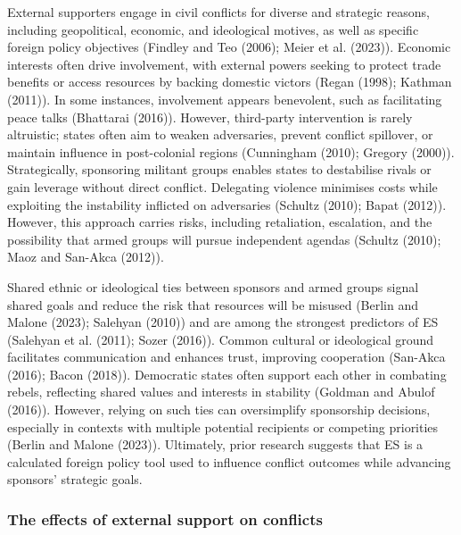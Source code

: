 \documentclass[
]{article}
\begin{document}
External supporters engage in civil conflicts for diverse and strategic
reasons, including geopolitical, economic, and ideological motives, as
well as specific foreign policy objectives (Findley and Teo (2006);
Meier et al. (2023)). Economic interests often drive involvement, with
external powers seeking to protect trade benefits or access resources by
backing domestic victors (Regan (1998); Kathman (2011)). In some
instances, involvement appears benevolent, such as facilitating peace
talks (Bhattarai (2016)). However, third-party intervention is rarely
altruistic; states often aim to weaken adversaries, prevent conflict
spillover, or maintain influence in post-colonial regions (Cunningham
(2010); Gregory (2000)). Strategically, sponsoring militant groups
enables states to destabilise rivals or gain leverage without direct
conflict. Delegating violence minimises costs while exploiting the
instability inflicted on adversaries (Schultz (2010); Bapat (2012)).
However, this approach carries risks, including retaliation, escalation,
and the possibility that armed groups will pursue independent agendas
(Schultz (2010); Maoz and San-Akca (2012)).

Shared ethnic or ideological ties between sponsors and armed groups
signal shared goals and reduce the risk that resources will be misused
(Berlin and Malone (2023); Salehyan (2010)) and are among the strongest
predictors of ES (Salehyan et al. (2011); Sozer (2016)). Common cultural
or ideological ground facilitates communication and enhances trust,
improving cooperation (San-Akca (2016); Bacon (2018)). Democratic states
often support each other in combating rebels, reflecting shared values
and interests in stability (Goldman and Abulof (2016)). However, relying
on such ties can oversimplify sponsorship decisions, especially in
contexts with multiple potential recipients or competing priorities
(Berlin and Malone (2023)). Ultimately, prior research suggests that ES
is a calculated foreign policy tool used to influence conflict outcomes
while advancing sponsors' strategic goals.

\subsubsection{The effects of external support on
conflicts}\label{the-effects-of-external-support-on-conflicts}
\end{document}
